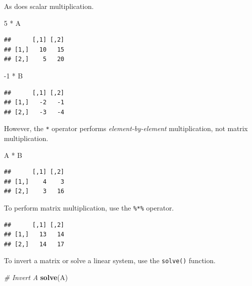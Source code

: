 \documentclass[12pt,oneside,openany]{book}
\newenvironment{Shaded}{\begin{snugshade}}{\end{snugshade}}
\newcommand{\KeywordTok}[1]{\textcolor[rgb]{0.13,0.29,0.53}{\textbf{{#1}}}}
\newcommand{\DecValTok}[1]{\textcolor[rgb]{0.00,0.00,0.81}{{#1}}}
\newcommand{\StringTok}[1]{\textcolor[rgb]{0.31,0.60,0.02}{{#1}}}
\newcommand{\CommentTok}[1]{\textcolor[rgb]{0.56,0.35,0.01}{\textit{{#1}}}}
\newcommand{\NormalTok}[1]{{#1}}
\begin{document}
As does scalar multiplication.

\begin{Shaded}
\begin{Highlighting}[]
\DecValTok{5} \NormalTok{*}\StringTok{ }\NormalTok{A}
\end{Highlighting}
\end{Shaded}

\begin{verbatim}
##      [,1] [,2]
## [1,]   10   15
## [2,]    5   20
\end{verbatim}

\begin{Shaded}
\begin{Highlighting}[]
\NormalTok{-}\DecValTok{1} \NormalTok{*}\StringTok{ }\NormalTok{B}
\end{Highlighting}
\end{Shaded}

\begin{verbatim}
##      [,1] [,2]
## [1,]   -2   -1
## [2,]   -3   -4
\end{verbatim}

However, the \texttt{*} operator performs \emph{element-by-element}
multiplication, not matrix multiplication.

\begin{Shaded}
\begin{Highlighting}[]
\NormalTok{A *}\StringTok{ }\NormalTok{B}
\end{Highlighting}
\end{Shaded}

\begin{verbatim}
##      [,1] [,2]
## [1,]    4    3
## [2,]    3   16
\end{verbatim}

To perform matrix multiplication, use the \texttt{\%*\%} operator.

\begin{Shaded}
\end{Shaded}

\begin{verbatim}
##      [,1] [,2]
## [1,]   13   14
## [2,]   14   17
\end{verbatim}

To invert a matrix or solve a linear system, use the \texttt{solve()}
function.

\begin{Shaded}
\begin{Highlighting}[]
\CommentTok{# Invert A}
\KeywordTok{solve}\NormalTok{(A)}
\end{Highlighting}
\end{Shaded}
\end{document}
